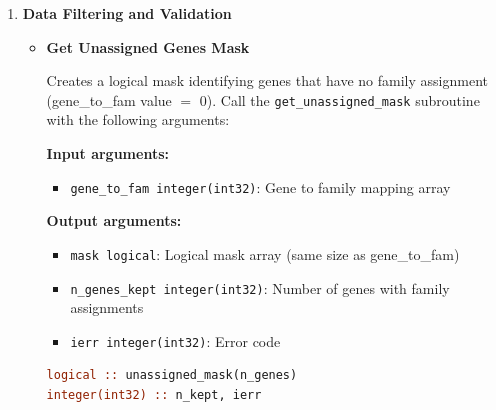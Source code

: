 \documentclass[11pt]{article}
\begin{document}
\begin{enumerate}
\begin{enumerate}
\begin{itemize}
\begin{lstlisting}[language=Fortran, caption={Complete Data Reading Workflow}]
! 2. Read gene IDs from expression file
call read_gene_ids_from_tsv_file('expression.tsv', gene_ids, &
                                    1, 1, ierr)

! 3. Read expression data (columns 2-68 contain sample data)
character(len=256) :: files(1) = ['expression.tsv']

call read_expression_vectors(files, gene_ids, expr_data, 1, 1, &
                             samples, 1, ierr)

! 4. Read family mapping from OrthoFinder
call read_orthofinder_file('Orthogroups.tsv', gene_ids, & 
                            family_ids, gene_to_fam, ierr)
	      	      	      \end{lstlisting}
	      	      \end{itemize}
	      \end{enumerate}
	      
	\item \textbf{Data Filtering and Validation}
	      \begin{itemize}
	      	\item \textbf{Get Unassigned Genes Mask}
	      	      
	      	      Creates a logical mask identifying genes that have no family assignment
	      	      (gene\_to\_fam value $=$ 0). Call the \texttt{get\_unassigned\_mask} subroutine
	      	      with the following arguments:
	      	      
	      	      \textbf{Input arguments:}
	      	      \begin{itemize}
	      	      	\item \texttt{gene\_to\_fam integer(int32)}: Gene to family mapping array
	      	      \end{itemize}
	      	      \textbf{Output arguments:}
	      	      \begin{itemize}
	      	      	\item \texttt{mask logical}: Logical mask array (same size as gene\_to\_fam)
	      	      	      
	      	      	\item \texttt{n\_genes\_kept integer(int32)}: Number of genes with family
	      	      	      assignments
	      	      	      
	      	      	\item \texttt{ierr integer(int32)}: Error code
	      	      \end{itemize}
	      	      \begin{lstlisting}[language=Fortran, caption={Create Unassigned Genes Mask}]
logical :: unassigned_mask(n_genes)
integer(int32) :: n_kept, ierr


\end{lstlisting}
\end{itemize}
\end{enumerate}
\end{document}
